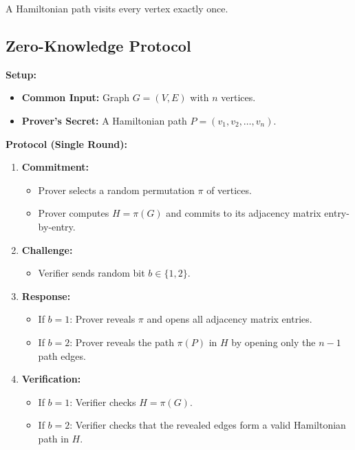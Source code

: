 \documentclass[11pt]{article}
\begin{document}
A Hamiltonian path visits every vertex exactly once.

\subsection{Zero-Knowledge Protocol}

\textbf{Setup:}
\begin{itemize}
    \item \textbf{Common Input:} Graph $G = (V, E)$ with $n$ vertices.
    \item \textbf{Prover's Secret:} A Hamiltonian path $P = (v_1, v_2, \ldots, v_n)$.
\end{itemize}

\textbf{Protocol (Single Round):}
\begin{enumerate}
    \item \textbf{Commitment:}
    \begin{itemize}
        \item Prover selects a random permutation $\pi$ of vertices.
        \item Prover computes $H = \pi(G)$ and commits to its adjacency matrix entry-by-entry.
    \end{itemize}
    
    \item \textbf{Challenge:}
    \begin{itemize}
        \item Verifier sends random bit $b \in \{1, 2\}$.
    \end{itemize}
    
    \item \textbf{Response:}
    \begin{itemize}
        \item If $b = 1$: Prover reveals $\pi$ and opens all adjacency matrix entries.
        \item If $b = 2$: Prover reveals the path $\pi(P)$ in $H$ by opening only the $n-1$ path edges.
    \end{itemize}
    
    \item \textbf{Verification:}
    \begin{itemize}
        \item If $b = 1$: Verifier checks $H = \pi(G)$.
        \item If $b = 2$: Verifier checks that the revealed edges form a valid Hamiltonian path in $H$.
    \end{itemize}
\end{enumerate}
\end{document}
